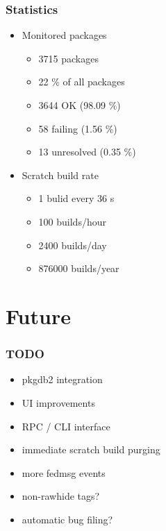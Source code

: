 \documentclass[pdftex,unicode,xcolor=table]{beamer}
\begin{document}
\begin{frame}
  \frametitle{Statistics}
  \begin{itemize}
    \item Monitored packages
    \begin{itemize}
      \item 3715 packages
      \item 22 \% of all packages
      \item 3644 OK (98.09 \%)
      \item 58 failing (1.56 \%)
      \item 13 unresolved (0.35 \%)
    \end{itemize}
    \item Scratch build rate
    \begin{itemize}
      \item 1 bulid every 36 s
      \item 100 builds/hour
      \item 2400 builds/day
      \item 876000 builds/year
    \end{itemize}
  \end{itemize}
\end{frame}


\section{Future}
\begin{frame}
  \frametitle{TODO}
  \begin{itemize}
    \item pkgdb2 integration
    \item UI improvements
    \item RPC / CLI interface
    \item immediate scratch build purging
    \item more fedmsg events
    \item non-rawhide tags?
    \item automatic bug filing?
  \end{itemize}
\end{frame}
\end{document}
